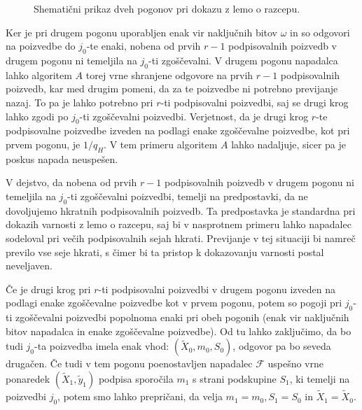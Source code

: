 \begin{dokaz}
\begin{figure}[ht]
    \caption[Prikaz dveh pogonov.]{Shematični prikaz dveh pogonov pri dokazu z lemo o razcepu.}
    \label{fig:forking_lemma}
\end{figure}

Ker je pri drugem pogonu uporabljen enak vir naključnih bitov $\omega$ in so odgovori na poizvedbe do
$j_0$-te enaki, nobena od prvih $r - 1$ podpisovalnih poizvedb v drugem pogonu ni temeljila na $j_0$-ti
zgoščevalni. V drugem pogonu napadalca lahko algoritem $A$ torej vrne shranjene odgovore na prvih
$r - 1$ podpisovalnih poizvedb, kar med drugim pomeni, da za te poizvedbe ni potrebno previjanje
nazaj. To pa je lahko potrebno pri $r$-ti podpisovalni poizvedbi, saj se drugi krog lahko zgodi po
$j_0$-ti zgoščevalni poizvedbi. Verjetnost, da je drugi krog $r$-te podpisovalne poizvedbe izveden
na podlagi enake zgoščevalne poizvedbe, kot pri prvem pogonu, je $1/q_H$. V tem primeru algoritem $A$
lahko nadaljuje, sicer pa je poskus napada neuspešen.

\begin{opomba}
    V dejstvo, da nobena od prvih $r - 1$ podpisovalnih poizvedb v drugem pogonu ni temeljila na
    $j_0$-ti zgoščevalni poizvedbi, temelji na predpostavki, da ne dovoljujemo hkratnih podpisovalnih
    poizvedb. Ta predpostavka je standardna pri dokazih varnosti z lemo o razcepu, saj bi v nasprotnem
    primeru lahko napadalec sodeloval pri večih podpisovalnih sejah hkrati. Previjanje v tej situaciji
    bi namreč previlo vse seje hkrati, s čimer bi ta pristop k dokazovanju varnosti postal neveljaven.
\end{opomba}

Če je drugi krog pri $r$-ti podpisovalni poizvedbi v drugem pogonu izveden na podlagi enake zgoščevalne
poizvedbe kot v prvem pogonu, potem so pogoji pri $j_0$-ti zgoščevalni poizvedbi popolnoma enaki pri
obeh pogonih (enak vir naključnih bitov napadalca in enake zgoščevalne poizvedbe). Od tu lahko zaključimo,
da bo tudi $j_0$-ta poizvedba imela enak vhod: $(\tilde{X}_0, m_0, S_0)$, odgovor pa bo seveda drugačen.
Če tudi v tem pogonu poenostavljen napadalec $\mathcal{F}$ uspešno vrne ponaredek $(\tilde{X}_1,
\tilde{y}_1)$ podpisa sporočila $m_1$ s strani podskupine $S_1$, ki temelji na poizvedbi $j_0$, potem
smo lahko prepričani, da velja $m_1 = m_0, S_1 = S_0$ in $\tilde{X}_1 = \tilde{X}_0$.


\end{dokaz}
